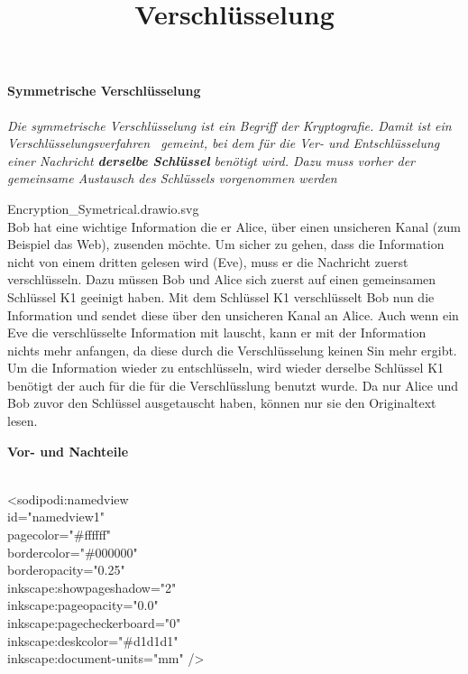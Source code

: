 \documentclass[
]{article}
\title{Verschlüsselung}
\author{}
\date{}
\begin{document}
\maketitle

\paragraph{Symmetrische
Verschlüsselung}\label{symmetrische-verschluxfcsselung}

\emph{Die symmetrische Verschlüsselung ist ein Begriff der Kryptografie.
Damit ist ein Verschlüsselungsverfahren~ gemeint, bei dem für die Ver-
und Entschlüsselung einer Nachricht \textbf{derselbe Schlüssel} benötigt
wird. Dazu muss vorher der gemeinsame Austausch des Schlüssels
vorgenommen werden}

{Encryption\_Symetrical.drawio.svg}\\
Bob hat eine wichtige Information die er Alice, über einen unsicheren
Kanal (zum Beispiel das Web), zusenden möchte. Um sicher zu gehen, dass
die Information nicht von einem dritten gelesen wird (Eve), muss er die
Nachricht zuerst verschlüsseln. Dazu müssen Bob und Alice sich zuerst
auf einen gemeinsamen Schlüssel K1 geeinigt haben. Mit dem Schlüssel K1
verschlüsselt Bob nun die Information und sendet diese über den
unsicheren Kanal an Alice. Auch wenn ein Eve die verschlüsselte
Information mit lauscht, kann er mit der Information nichts mehr
anfangen, da diese durch die Verschlüsselung keinen Sin mehr ergibt. Um
die Information wieder zu entschlüsseln, wird wieder derselbe Schlüssel
K1 benötigt der auch für die für die Verschlüsslung benutzt wurde. Da
nur Alice und Bob zuvor den Schlüssel ausgetauscht haben, können nur sie
den Originaltext lesen.

\hfill\break

\textbf{Vor- und Nachteile}

\strut \\
\textless sodipodi:namedview\\
id="namedview1"\\
pagecolor="\#ffffff"\\
bordercolor="\#000000"\\
borderopacity="0.25"\\
inkscape:showpageshadow="2"\\
inkscape:pageopacity="0.0"\\
inkscape:pagecheckerboard="0"\\
inkscape:deskcolor="\#d1d1d1"\\
inkscape:document-units="mm" /\textgreater{}\\
\end{document}
